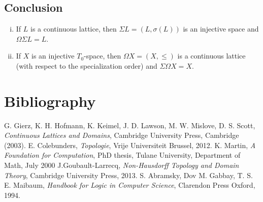 \documentclass{beamer}
\begin{document}
\subsection{Conclusion}
\begin{frame}
\begin{theorem}
\begin{enumerate}[(i)]
  \item If $L$ is a continuous lattice, then $\Sigma L = (L, \sigma(L))$ is an injective space and $\Omega\Sigma L = L$.
  \item If $X$ is an injective $T_0$-space, then $\Omega X = (X, \leq)$ is a continuous lattice (with respect to the specialization order) and $\Sigma\Omega X = X$.
\end{enumerate}
\end{theorem}

\end{frame}
\section{Bibliography}
\begin{frame}
\begin{block}{}
\begin{thebibliography}{99}
 G. Gierz, K. H. Hofmann, K. Keimel, J. D. Lawson, M. W. Mislove, D. S. Scott, {\em Continuous Lattices and Domains}, Cambridge University Press, Cambridge (2003).
 E. Colebunders, \emph{Topologie}, Vrije Universiteit Brussel, 2012.
 K. Martin, \emph{A Foundation for Computation}, PhD thesis, Tulane University, Department of Math, July 2000
 J.Goubault-Larrecq, \emph{Non-Hausdorff Topology and Domain Theory}, Cambridge University Press, 2013.
 S. Abramsky, Dov M. Gabbay, T. S. E. Maibaum, \emph{Handbook for Logic in
Computer Science}, Clarendon Press Oxford, 1994.
    \end{thebibliography}
\end{block}
\end{frame}
\end{document}
